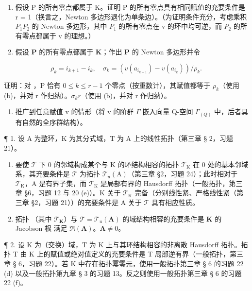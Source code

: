 \begin{enumerate}
\def\labelenumi{(\alph{enumi})}
\setcounter{enumi}{1}
\item
  假设 P 的所有零点都属于 K。证明 P 的所有零点具有相同赋值的充要条件是 r = 1（换言之，Newton 多边形退化为单条边）。（为证明条件充分，考虑乘积 \(P_{1}P_{2}\) 的 Newton 多边形，其中 \(P_{1}\) 的所有零点在 v 的环中均可逆，而 \(P_{2}\) 的所有零点都属于 v 的理想。）
\item
  假设 \(\mathbf{P}\) 的所有零点都属于 \(\mathbf{K}\)；作出 \(\mathbf{P}\) 的 Newton 多边形并令
\end{enumerate}

\[
\rho_ {k} = i _ {k + 1} - i _ {k}, \quad \sigma_ {k} = (v (a _ {i _ {k + 1}}) - v (a _ {i _ {k}})) / \rho_ {k}.
\]

证明：对 ，P 恰有 \(0 \leqslant k \leqslant r - 1\) 个零点（按重数计），其赋值都等于 \(\rho_k\)（使用 (b)，并对 r 作归纳）。\(\sigma_k\)\(r\)（使用 (b)，并对 r 作归纳）。

\begin{enumerate}
\def\labelenumi{(\alph{enumi})}
\setcounter{enumi}{3}
\tightlist
\item
  推广到任意赋值 v 的情形（将 v 的阶群 \(\Gamma\) 嵌入向量 Q-空间 \(\Gamma_{(Q)}\) 中，后者具有自然的全序群结构）。
\end{enumerate}


¶ 1. 设 A 为整环，K 为其分式域，T 为 A 上的线性拓扑（第三章 § 2，习题 21）。

\begin{enumerate}
\def\labelenumi{(\alph{enumi})}
\item
  要使 \(\mathcal{T}\) 下 0 的邻域构成某个与 K 的环结构相容的拓扑 \(\mathcal{T}_{\mathrm{K}}\) 在 0 处的基本邻域系，其充要条件是 \(\mathcal{T}\) 为拓扑 \(\mathcal{T}_{u}(\mathrm{A})\)（第三章 §2，习题 24）；此时相对于 \(\mathcal{T}_{\mathrm{K}}\)，A 是有界子集，而 \(\mathcal{T}_{\mathrm{K}}\) 是局部有界的 Hausdorff 拓扑（一般拓扑，第三章 §6，习题 12 与 20 (e)）。K 关于 \(\mathcal{T}_{\mathrm{K}}\) 完备（分别线性紧、严格线性紧（第三章 §2，习题 21））的充要条件是 A 关于 \(\mathcal{T}\) 具有相应性质。
\item
  拓扑 （其中 \(\mathcal{T}_{\mathbf{K}}\)）与 \(\mathcal{T} = \mathcal{T}_u(\mathbf{A})\) 的域结构相容的充要条件是 \(\mathbf{K}\) 的 Jacobson 根  满足 \(\Re(\mathbf{A})\)。\(\mathbf{A}\)\(\neq 0\)。
\end{enumerate}

¶ 2. 设 K 为（交换）域，T 为 K 上与其环结构相容的非离散 Hausdorff 拓扑。拓扑 T 由 K 上的赋值或绝对值定义的充要条件是 T 局部逆有界（一般拓扑，第三章 § 6，习题 22）。若 K 中存在拓扑幂零元，使用一般拓扑第三章 § 6 的习题 22 (d) 以及一般拓扑第九章 § 3 的习题 13。反之则使用一般拓扑第三章 § 6 的习题 22 (f)。

